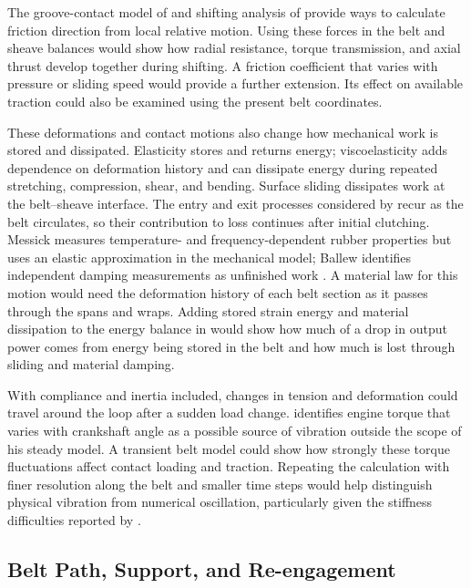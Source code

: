 \documentclass[11pt]{report}
\numberwithin{equation}{section}
\begin{document}
The groove-contact model of \citet{KongParker2006} and shifting analysis of
\citet{Sorge2008} provide ways to calculate friction direction from local
relative motion. Using these forces in the belt and sheave balances would show
how radial resistance, torque transmission, and axial thrust develop together
during shifting. A friction coefficient that varies with pressure or sliding
speed would provide a further extension. Its effect on available traction
could also be examined using the present belt coordinates.

These deformations and contact motions also change how mechanical work is
stored and dissipated. Elasticity stores and returns energy; viscoelasticity
adds dependence on deformation history and can dissipate energy during
repeated stretching, compression, shear, and bending. Surface sliding
dissipates work at the belt--sheave interface. The entry and exit processes
considered by \citet{Bertini2014} recur as the belt circulates, so their
contribution to loss continues after initial clutching. Messick measures
temperature- and frequency-dependent rubber properties but uses an elastic
approximation in the mechanical model; Ballew identifies independent damping
measurements as unfinished work \citep{Messick2018,Ballew2015}. A material law
for this motion would need the deformation history of each belt section as it
passes through the spans and wraps. Adding stored strain energy and material
dissipation to the energy balance in 
would show how much of a drop in output power comes from energy being stored
in the belt and how much is lost through sliding and material damping.

With compliance and inertia included, changes in tension and deformation could
travel around the loop after a sudden load change. \citet{Messick2018}
identifies engine torque that varies with crankshaft angle as a possible
source of vibration outside the scope of his steady model. A transient belt
model could show how strongly these torque fluctuations affect contact loading
and traction. Repeating the calculation with finer resolution along the belt
and smaller time steps would help distinguish physical vibration from
numerical oscillation, particularly given the stiffness difficulties reported
by \citet{Ballew2015}.

\subsection*{Belt Path, Support, and Re-engagement}
\label{sec:future_work_belt_path}
\end{document}
